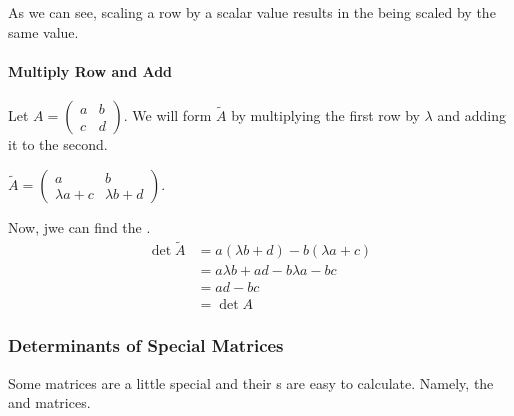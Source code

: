As we can see, scaling a row by a scalar value results in the  being scaled by the same value.

\paragraph{Multiply Row and Add}
Let $A =
\begin{pmatrix}
  a & b \\
  c & d
\end{pmatrix}$.
We will form $\tilde{A}$ by multiplying the first row by $\lambda$ and adding it to the second.

$\tilde{A} =
\begin{pmatrix}
  a & b \\
  \lambda a + c & \lambda b + d
\end{pmatrix}$.

Now, jwe can find the .
\begin{align*}
  \det \tilde{A} &= a(\lambda b + d) - b(\lambda a + c) \\
                 &= a \lambda b + ad - b \lambda a - bc \\
                 &=  ad - bc \\
                 &= \det A
\end{align*}

\subsubsection{Determinants of Special Matrices}\label{subsubsec:Determinants_Special_Matrices}
Some matrices are a little special and their s are easy to calculate.
Namely, the  and  matrices.


